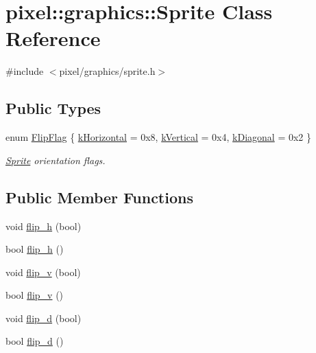 \hypertarget{classpixel_1_1graphics_1_1_sprite}{}\section{pixel\+:\+:graphics\+:\+:Sprite Class Reference}
\label{classpixel_1_1graphics_1_1_sprite}


{\ttfamily \#include $<$pixel/graphics/sprite.\+h$>$}

\subsection*{Public Types}
\begin{DoxyCompactItemize}
\item 
enum \hyperlink{classpixel_1_1graphics_1_1_sprite_a899da5dbedfe7486c6b4d009a8171c13}{Flip\+Flag} \{ \hyperlink{classpixel_1_1graphics_1_1_sprite_a899da5dbedfe7486c6b4d009a8171c13a159212efa9c158a08a40799fcb389cb2}{k\+Horizontal} = 0x8, 
\hyperlink{classpixel_1_1graphics_1_1_sprite_a899da5dbedfe7486c6b4d009a8171c13acaef422fcf7e0e0cc363b3d94a8c87fb}{k\+Vertical} = 0x4, 
\hyperlink{classpixel_1_1graphics_1_1_sprite_a899da5dbedfe7486c6b4d009a8171c13ac877e28904da2fa88b27faf1f5250a9e}{k\+Diagonal} = 0x2
 \}\begin{DoxyCompactList}\small\item\em \hyperlink{classpixel_1_1graphics_1_1_sprite}{Sprite} orientation flags. \end{DoxyCompactList}
\end{DoxyCompactItemize}
\subsection*{Public Member Functions}
\begin{DoxyCompactItemize}
\item 
void \hyperlink{classpixel_1_1graphics_1_1_sprite_a50443f08383325b250bc375e1f5ee563}{flip\+\_\+h} (bool)
\item 
bool \hyperlink{classpixel_1_1graphics_1_1_sprite_a09ad44e665a5420cfaa41ace195f46f1}{flip\+\_\+h} ()
\item 
void \hyperlink{classpixel_1_1graphics_1_1_sprite_a8541b2280778b2c8169e39e47afa06c7}{flip\+\_\+v} (bool)
\item 
bool \hyperlink{classpixel_1_1graphics_1_1_sprite_a4d9b8733ced8d9461e31bad35873973f}{flip\+\_\+v} ()
\item 
void \hyperlink{classpixel_1_1graphics_1_1_sprite_a91c571276d509e111e41cb6b0346408c}{flip\+\_\+d} (bool)
\item 
bool \hyperlink{classpixel_1_1graphics_1_1_sprite_a0c07bc6cb4e07c0c14ec0b2ebe5d49d5}{flip\+\_\+d} ()
\end{DoxyCompactItemize}
